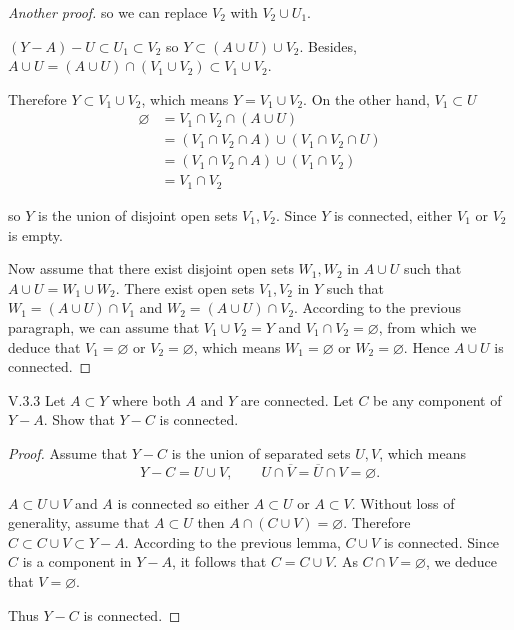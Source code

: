 \begin{proof}[Another proof]
	so we can replace \( V_{2} \) with \( V_{2} \cup U_{1} \).

	\( (Y - A) - U \subset U_{1} \subset V_{2} \) so \( Y \subset (A \cup U) \cup V_{2} \). Besides, \( A \cup U = (A \cup U) \cap (V_{1} \cup V_{2}) \subset V_{1} \cup V_{2} \).

	Therefore \( Y \subset V_{1} \cup V_{2} \), which means \( Y = V_{1} \cup V_{2} \). On the other hand, \( V_{1} \subset U \)
	\begingroup
	\allowdisplaybreaks%
	\begin{align*}
		\varnothing & = V_{1} \cap V_{2} \cap (A \cup U)                         \\
		            & = (V_{1} \cap V_{2} \cap A) \cup (V_{1} \cap V_{2} \cap U) \\
		            & = (V_{1} \cap V_{2} \cap A) \cup (V_{1} \cap V_{2})        \\
		            & = V_{1} \cap V_{2}
	\end{align*}
	\endgroup

	so \( Y \) is the union of disjoint open sets \( V_{1}, V_{2} \). Since \( Y \) is connected, either \( V_{1} \) or \( V_{2} \) is empty.

	\bigskip

	Now assume that there exist disjoint open sets \( W_{1}, W_{2} \) in \( A \cup U \) such that \( A\cup U = W_{1} \cup W_{2} \). There exist open sets \( V_{1}, V_{2} \) in \( Y \) such that \( W_{1} = (A\cup U) \cap V_{1} \) and \( W_{2} = (A\cup U) \cap V_{2} \). According to the previous paragraph, we can assume that \( V_{1} \cup V_{2} = Y \) and \( V_{1} \cap V_{2} = \varnothing \), from which we deduce that \( V_{1} = \varnothing \) or \( V_{2} = \varnothing \), which means \( W_{1} = \varnothing \) or \( W_{2} = \varnothing \). Hence \( A \cup U \) is connected.
\end{proof}

\begin{problem}{V.3.3}
Let \( A \subset Y \) where both \( A \) and \( Y \) are connected. Let \( C \) be any component of \( Y - A \). Show that \( Y - C \) is connected.
\end{problem}

\begin{proof}
	Assume that \( Y - C \) is the union of separated sets \( U, V \), which means
	\[
		Y - C = U \cup V,\qquad U \cap \overline{V} = \overline{U} \cap V = \varnothing.
	\]

	\( A \subset U \cup V \) and \( A \) is connected so either \( A \subset U \) or \( A \subset V \). Without loss of generality, assume that \( A \subset U \) then \( A \cap (C \cup V) = \varnothing \). Therefore \( C \subset C \cup V \subset Y - A \). According to the previous lemma, \( C \cup V \) is connected. Since \( C \) is a component in \( Y - A \), it follows that \( C = C \cup V \). As \( C \cap V = \varnothing \), we deduce that \( V = \varnothing \).

	Thus \( Y - C \) is connected.
\end{proof}


